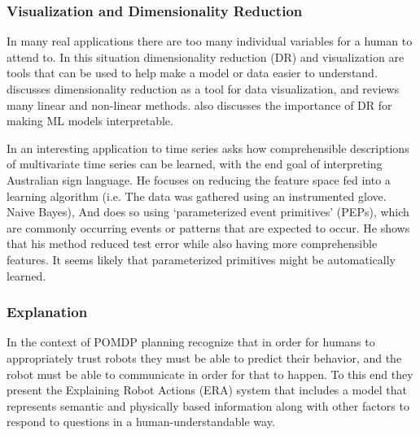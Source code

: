 \subsubsection{Visualization and Dimensionality Reduction}
    In many real applications there are too many individual variables for a human to attend to. In this situation dimensionality reduction (DR) and visualization are tools that can be used to help make a model or data easier to understand. \citet{Venna2007-yj} discusses dimensionality reduction as a tool for data visualization, and reviews many linear and non-linear methods. \citet{Vellido2012-nm} also discusses the importance of DR for making ML models interpretable.

    In an interesting application to time series \citet{Kadous1999-rx} asks how comprehensible descriptions of multivariate time series can be learned, with the end goal of interpreting Australian sign language. He focuses on reducing the feature space fed into a learning algorithm (i.e. The data was gathered using an instrumented glove. Naive Bayes), And does so using `parameterized event primitives' (PEPs), which are commonly occurring events or patterns that are expected to occur. He shows that his method reduced test error while also having more comprehensible features. It seems likely that parameterized primitives might be automatically learned.

%

\subsubsection{Explanation}
    In the context of POMDP planning \citet{Lomas2012-ie} recognize that in order for humans to appropriately trust robots they must be able to predict their behavior, and the robot must be able to communicate in order for that to happen. To this end they present the Explaining Robot Actions (ERA) system that includes a model that represents semantic and physically based information along with other factors to respond to questions in a human-understandable way.

